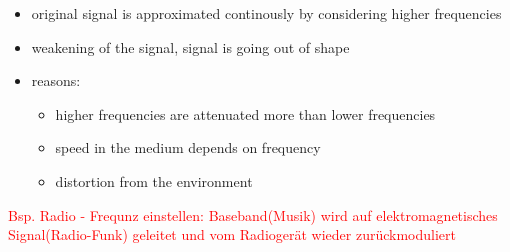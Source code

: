 \documentclass[a4paper,12pt]{article}
\begin{document}
\begin{itemize}[itemsep=0pt]
	\item  original signal is approximated continously by considering higher frequencies
	\item  weakening of the signal, signal is going out of shape
	\item  reasons:
	\begin{itemize}[itemsep=0pt]
		\item  higher frequencies are attenuated more than lower frequencies
		\item  speed in the medium depends on frequency
		\item  distortion from the environment
	\end{itemize}
\end{itemize}
\textcolor{red}{Bsp. Radio - Frequnz einstellen: Baseband(Musik) wird auf elektromagnetisches Signal(Radio-Funk) geleitet und vom Radiogerät wieder zurückmoduliert}
\end{document}

